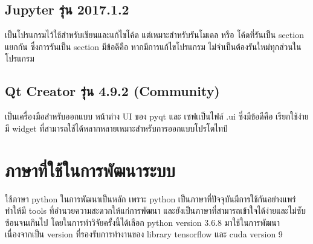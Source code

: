 \subsection*{Jupyter รุ่น 2017.1.2} เป็นโปรแกรมไว้ใช้สำหรับเขียนและแก้ไขโค้ด แต่เหมาะสำหรับรันโมเดล หรือ โค้ดที่รันเป็น section แยกกัน ซึ่งการรันเป็น section มีข้อดีคือ หากมีการแก้ไขโปรแกรม ไม่จำเป็นต้องรันใหม่ทุกส่วนในโปรแกรม

\subsection*{Qt Creator รุ่น 4.9.2 (Community)}
เป็นเครื่องมือสำหรับออกแบบ หน้าต่าง UI ของ pyqt และ เซฟเเป็นไฟล์ .ui ซึ่งมีข้อดีคือ เรียกใช้ง่าย มี  widget ที่สามารถใช้ได้หลากหลายเหมาะสำหรับการออกแบบโปรโตไทป์


\clearpage
\section{ภาษาที่ใช้ในการพัฒนาระบบ} 
	ใช้ภาษา python ในการพัฒนาเป็นหลัก เพราะ python เป็นภาษาที่ปัจจุบันมีการใช้กันอย่างแพร่ทำให้มี tools ที่อำนวยความสะดวกให้แก่การพัฒนา และยังเป็นภาษาที่สามารถเข้าใจได้ง่ายและไม่ซับซ้อนจนเกินไป โดยในการทำวิจัยครั้งนี้ได้เลือก python version 3.6.8 มาใช้ในการพัฒนา เนื่องจากเป็น version ที่รองรับการทำงานของ library tensorflow และ cuda version 9

\vspace{3mm}
